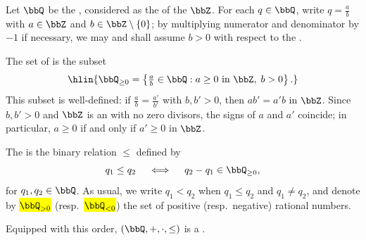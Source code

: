 \begin{definition} \label{definition:standard_order_on_field_of_rational_numbers}
    Let $\bbQ$ be the , considered as the  of the  $\bbZ$. For each $q \in \bbQ$, write $q = \frac{a}{b}$ with $a \in \bbZ$ and $b \in \bbZ \setminus \{0\}$; by multiplying numerator and denominator by $-1$ if necessary, we may and shall assume $b > 0$ with respect to the .

    The set of  is the subset
    $$\hlin{\bbQ_{\ge 0} = \left\{ \tfrac{a}{b} \in \bbQ : a \ge 0 \text{ in } \bbZ,\; b > 0 \right\}.}$$
    This subset is well-defined: if $\frac{a}{b} = \frac{a'}{b'}$ with $b,b' > 0$, then $ab' = a'b$ in $\bbZ$. Since $b,b' > 0$ and $\bbZ$ is an  with no zero divisors, the signs of $a$ and $a'$ coincide; in particular, $a \ge 0$ if and only if $a' \ge 0$ in $\bbZ$.

    The  is the binary relation $\le$ defined by
    $$q_1 \le q_2 \quad\iff\quad q_2 - q_1 \in \bbQ_{\ge 0},$$
    for $q_1,q_2 \in \bbQ$. As usual, we write $q_1 < q_2$ when $q_1 \le q_2$ and $q_1 \neq q_2$, and denote by \hl{$\bbQ_{> 0}$} (resp.~\hl{$\bbQ_{< 0}$}) the set of positive (resp.~negative) rational numbers.

    Equipped with this order, $(\bbQ, +, \cdot, \le)$ is a .
\end{definition}